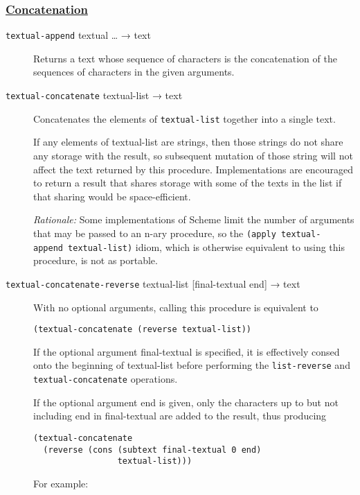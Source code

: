 \subsubsection{\texorpdfstring{\href{}{Concatenation}}{Concatenation}}\label{concatenation}

\begin{description}
\item[ \href{}{} \texttt{textual-append} textual \ldots{} → text ]
Returns a text whose sequence of characters is the concatenation of the
sequences of characters in the given arguments.
\item[ \href{}{} \texttt{textual-concatenate} textual-list → text ]
Concatenates the elements of \texttt{textual-list} together into a
single text.

If any elements of textual-list are strings, then those strings do not
share any storage with the result, so subsequent mutation of those
string will not affect the text returned by this procedure.
Implementations are encouraged to return a result that shares storage
with some of the texts in the list if that sharing would be
space-efficient.

\emph{Rationale:} Some implementations of Scheme limit the number of
arguments that may be passed to an n-ary procedure, so the
\texttt{(apply\ textual-append\ textual-list)} idiom, which is otherwise
equivalent to using this procedure, is not as portable.
\item[ \href{}{} \texttt{textual-concatenate-reverse} textual-list
{[}final-textual end{]} → text ]
With no optional arguments, calling this procedure is equivalent to

\begin{verbatim}
(textual-concatenate (reverse textual-list))
\end{verbatim}

If the optional argument final-textual is specified, it is effectively
consed onto the beginning of textual-list before performing the
\texttt{list-reverse} and \texttt{textual-concatenate} operations.

If the optional argument end is given, only the characters up to but not
including end in final-textual are added to the result, thus producing

\begin{verbatim}
(textual-concatenate 
  (reverse (cons (subtext final-textual 0 end)
                 textual-list)))
\end{verbatim}

For example:


\end{description}
